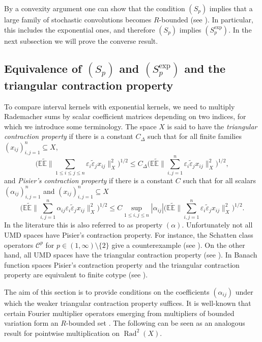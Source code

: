\documentclass{amsart}
\let\leq\leqslant
\theoremstyle{plain}
\theoremstyle{remark}
\theoremstyle{plain}
\numberwithin{equation}{section}
\newcommand{\E}{\mathbb E}
\newcommand{\1}{\mathbf 1}
\newcommand{\Rad}{\operatorname{Rad}}
\newcommand{\wt}{\widetilde}
\begin{document}
By a convexity argument one can show that the condition $(S_p)$ implies that a large family of stochastic convolutions becomes $R$-bounded (see \cite[Proposition 3.2]{NVW-SMR}). In particular, this includes the exponential ones, and therefore $(S_p)$ implies $(S_p^{\exp})$. In the next subsection we will prove the converse result.

\subsection{Equivalence of \texorpdfstring{$(S_p)$ and $(S_p^{\exp})$}{Sp and Spexp} and the triangular contraction property}\label{ss:triangular}

To compare interval kernels with exponential kernels, we need to multiply Rademacher sums by scalar coefficient matrices depending on two indices, for which we introduce some terminology. The space $X$ is said to have the {\em triangular contraction property} if there is a constant $C_\Delta$ such that for all finite families
$(x_{ij})_{i,j=1}^n\subseteq X$,
\[
    \Big(\E \wt{\E}\Big\| \sum_{1\leq i\leq j\leq n}\varepsilon_i\wt{\varepsilon}_j x_{ij}\Big\|_X^2\Big)^{1/2}\leq C_\Delta \Big(\E\wt{\E}\Big\|           \sum_{i,j=1}^n\varepsilon_i\wt{\varepsilon}_j x_{ij}\Big\|_X^2 \Big)^{1/2}, 
\]
and {\em Pisier's contraction property} if there is a constant $C$ such that for all scalars $(\alpha_{ij})_{i,j=1}^n$ and $(x_{ij})_{i,j=1}^n\subseteq X$
\[
    \Big(\E\wt{\E}\Big\|\sum_{i,j=1}^n \alpha_{ij} \varepsilon_i\wt{\varepsilon}_j x_{ij} \Big\|_X^2\Big)^{1/2}\leq C \sup_{1\leq i,j\leq n} |\alpha_{ij}|\Big(\E\wt{\E}\Big\|            \sum_{i,j=1}^n\varepsilon_i\wt{\varepsilon}_j x_{ij}\Big\|_X^2\Big)^{1/2}.
\]
In the literature this is also referred to as property $(\alpha)$. Unfortunately not all UMD spaces have Pisier's contraction property. For instance, the Schatten class operators $\mathcal{C}^p$ for $p\in (1, \infty)\setminus \{2\}$ give a counterexample (see \cite[Proposition 7.5.6]{HNVW2}). On the other hand, all UMD spaces have the triangular contraction property (see \cite[Theorem 5.6.9]{HNVW2}). In Banach function spaces Pisier's contraction property and the triangular contraction property are equivalent to finite cotype (see \cite[Theorem 7.5.20]{HNVW2}).

The aim of this section is to provide conditions on the coefficients $(\alpha_{ij})$ under which the weaker triangular contraction property suffices. It is well-known that certain Fourier multiplier operators emerging from multipliers of bounded variation form an $R$-bounded set \cite[Theorem 8.3.4]{HNVW2}. The following can be seen as an analogous result for pointwise multiplication on $\Rad^2(X)$.
\end{document}
